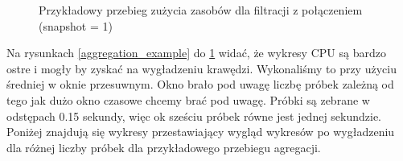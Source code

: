\begin{figure}[!h]
  \centering
  \hfill
  \caption{Przykładowy przebieg zużycia zasobów dla filtracji z połączeniem (snapshot = 1)}
  \label{filtration-join_example}
  
\end{figure}

Na rysunkach \ref{aggregation_example} do \ref{filtration-join_example} widać, że wykresy CPU są bardzo ostre i mogły by zyskać na wygładzeniu krawędzi. Wykonaliśmy to przy użyciu średniej w oknie przesuwnym. Okno brało pod uwagę liczbę próbek zależną od tego jak dużo okno czasowe chcemy brać pod uwagę. Próbki są zebrane w odstępach 0.15 sekundy, więc ok sześciu próbek równe jest jednej sekundzie. Poniżej znajdują się wykresy przestawiający wygląd wykresów po wygładzeniu dla różnej liczby próbek dla przykładowego przebiegu agregacji.

